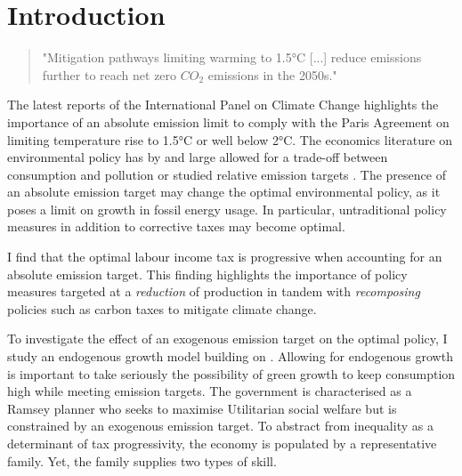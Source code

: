 \section{Introduction}

\begin{quote}
"Mitigation pathways limiting warming to 1.5°C [...]  reduce emissions further to reach net zero $CO_2$ emissions in the 2050s."
\end{quote}

The latest reports of the International Panel on Climate Change \citep{Rogelj2018MitigationDevelopment.} highlights the importance of an absolute emission limit to comply with the Paris Agreement on limiting temperature rise to 1.5°C or well below 2°C. 
The economics literature on environmental policy has by and large allowed for a trade-off between consumption and pollution \citep{Barrage2019OptimalPolicy, Golosov2014OptimalEquilibrium} or studied relative emission targets \citep{Fried2018ClimateAnalysis}. 
The presence of an absolute emission target may change the optimal environmental policy, as it poses a limit on growth in fossil energy usage.
In particular, untraditional policy measures in addition to corrective taxes may become optimal. %

 I find that the optimal labour income tax is progressive when accounting for an absolute emission target. This finding highlights the importance of policy measures targeted at a \textit{reduction} of production in tandem with \textit{recomposing} policies such as carbon taxes to mitigate climate change. %

To investigate the effect of an exogenous emission target on the optimal policy, I study an endogenous growth model building on \cite{Fried2018ClimateAnalysis}. Allowing for endogenous growth is important to take seriously the possibility of green growth to keep consumption high while meeting emission targets. The government is characterised as a Ramsey planner who seeks to maximise Utilitarian social welfare but is constrained by an exogenous emission target. To abstract from inequality as a determinant of tax progressivity, the economy is populated by a representative family. Yet, the family supplies two types of skill. 

